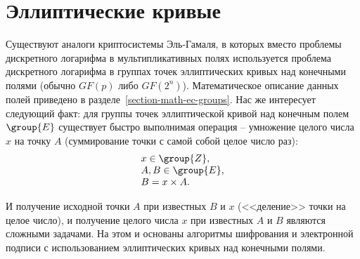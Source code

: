 \section{Эллиптические кривые}\label{section-elliptic-curve-cryptosystems}

Существуют аналоги криптосистемы Эль-Гамаля, в которых вместо проблемы дискретного логарифма в мультипликативных полях используется проблема дискретного логарифма в группах точек эллиптических кривых над конечными полями (обычно $GF(p)$ либо $GF(2^n)$). Математическое описание данных полей приведено в разделе~\ref{section-math-ec-groups}. Нас же интересует следующий факт: для группы точек эллиптической кривой над конечным полем $\group{E}$ существует быстро выполнимая операция -- умножение целого числа $x$ на точку $A$ (суммирование точки с самой собой целое число раз):
\[ \begin{array}{l}
	x \in \group{Z}, \\
	A, B \in \group{E}, \\
	B = x \times A. \\
\end{array} \]

И получение исходной точки $A$ при известных $B$ и $x$ (<<деление>> точки на целое число), и получение целого числа $x$ при известных $A$ и $B$ являются сложными задачами. На этом и основаны алгоритмы шифрования и электронной подписи с использованием эллиптических кривых над конечными полями.




